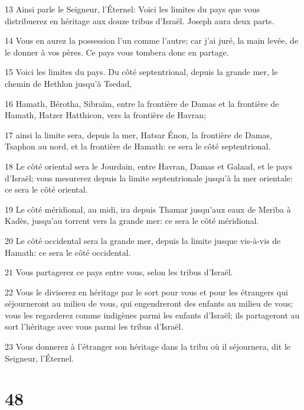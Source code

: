 \par 13 Ainsi parle le Seigneur, l'Éternel: Voici les limites du pays que vous distribuerez en héritage aux douze tribus d'Israël. Joseph aura deux parts.
\par 14 Vous en aurez la possession l'un comme l'autre; car j'ai juré, la main levée, de le donner à vos pères. Ce pays vous tombera donc en partage.
\par 15 Voici les limites du pays. Du côté septentrional, depuis la grande mer, le chemin de Hethlon jusqu'à Tsedad,
\par 16 Hamath, Bérotha, Sibraïm, entre la frontière de Damas et la frontière de Hamath, Hatzer Hatthicon, vers la frontière de Havran;
\par 17 ainsi la limite sera, depuis la mer, Hatsar Énon, la frontière de Damas, Tsaphon au nord, et la frontière de Hamath: ce sera le côté septentrional.
\par 18 Le côté oriental sera le Jourdain, entre Havran, Damas et Galaad, et le pays d'Israël; vous mesurerez depuis la limite septentrionale jusqu'à la mer orientale: ce sera le côté oriental.
\par 19 Le côté méridional, au midi, ira depuis Thamar jusqu'aux eaux de Meriba à Kadès, jusqu'au torrent vers la grande mer: ce sera le côté méridional.
\par 20 Le côté occidental sera la grande mer, depuis la limite jusque vis-à-vis de Hamath: ce sera le côté occidental.
\par 21 Vous partagerez ce pays entre vous, selon les tribus d'Israël.
\par 22 Vous le diviserez en héritage par le sort pour vous et pour les étrangers qui séjourneront au milieu de vous, qui engendreront des enfants au milieu de vous; vous les regarderez comme indigènes parmi les enfants d'Israël; ils partageront au sort l'héritage avec vous parmi les tribus d'Israël.
\par 23 Vous donnerez à l'étranger son héritage dans la tribu où il séjournera, dit le Seigneur, l'Éternel.

\chapter{48}

